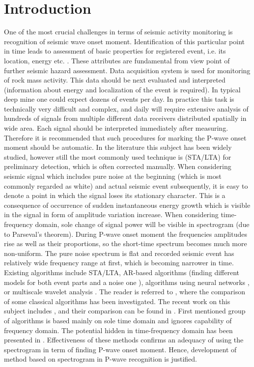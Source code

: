 \documentclass[smallextended]{svjour3}       %
\begin{document}
\section{Introduction}

One of the most crucial challenges in terms of seismic activity monitoring is recognition of seismic wave onset moment. Identification of this particular point in time leads to assessment of basic properties for registered event, i.e. its location, energy etc. \cite{kwiatek2013assessment}. These attributes are fundamental from view point of further seismic hazard assessment. Data acquisition system is used for monitoring of rock mass activity. This data should be next evaluated and interpreted (information about energy and localization of the event is required). In typical deep mine one could expect dozens of events per day. In practice this task is technically very difficult and complex, and daily will require extensive analysis of hundreds of signals from multiple different data receivers distributed spatially in wide area. Each signal should be interpreted immediately after measuring. Therefore it is recommended that such procedures for marking the P-wave onset moment should be automatic. In the literature this subject has been widely studied, however still the most commonly used technique is (STA/LTA) for preliminary detection, which is often corrected manually. When considering seismic signal which includes pure noise at the beginning (which is most commonly regarded as white) and actual seismic event subsequently, it is easy to denote a point in which the signal loses its stationary character. This is a consequence of occurrence of sudden instantaneous energy growth which is visible in the signal in form of amplitude variation increase. When considering time-frequency domain, sole change of signal power will be visible in spectrogram (due to Parseval's theorem). During P-wave onset moment the frequencies amplitudes rise as well as their proportions, so the short-time spectrum becomes much more non-uniform. The pure noise spectrum is flat and recorded seismic event has relatively wide frequency range at first, which is becoming narrower in time. Existing algorithms include STA/LTA, AR-based algorithms (finding different models for both event parts and a noise one \cite{sleeman1999robust,leonard1999multi}), algorithms using neural networks \cite{wang1995artificial}, or multiscale wavelet analysis \cite{zhang2003automatic}. The reader is referred to \cite{leonard2000comparison,withers1998comparison}, where the comparison of some classical algorithms has been investigated. The recent work on this subject includes \cite{sokolowski2016algorithm,nurhaida2017detecting,polak2017seismic,zimroz20150000}, and their comparison can be found in \cite{sokolowski2016comparison}. First mentioned group of algorithms is based mainly on sole time domain and ignores capability of frequency domain. The potential hidden in time-frequency domain has been presented in \cite{hafez2009earthquake,xiantai2011adaptive}. Effectiveness of these methods confirms an adequacy of using the spectrogram in term of finding P-wave onset moment. Hence, development of method based on spectrogram in P-wave recognition is justified.
\end{document}
